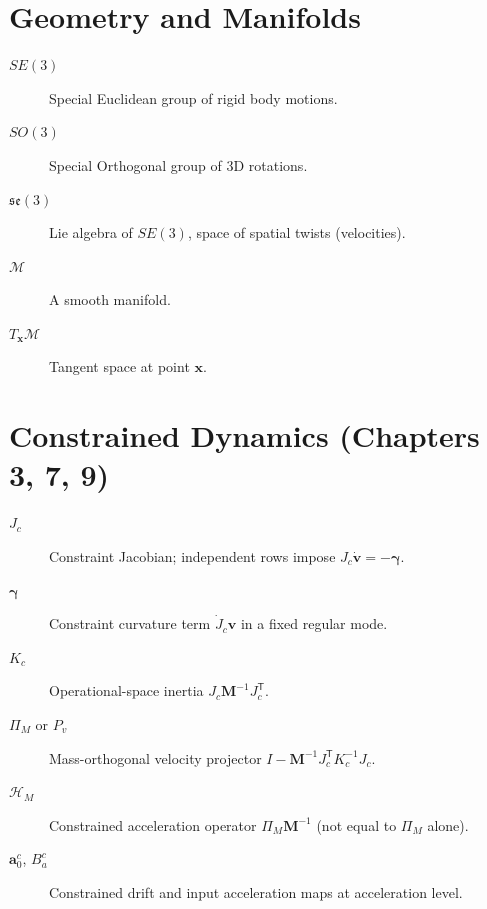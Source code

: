 \section*{Geometry and Manifolds}
\begin{description}
    \item[$SE(3)$] Special Euclidean group of rigid body motions.
    \item[$SO(3)$] Special Orthogonal group of 3D rotations.
    \item[$\mathfrak{se}(3)$] Lie algebra of $SE(3)$, space of spatial twists (velocities).
    \item[$\mathcal{M}$] A smooth manifold.
    \item[$T_{\mathbf{x}}\mathcal{M}$] Tangent space at point $\mathbf{x}$.
\end{description}

\section*{Constrained Dynamics (Chapters 3, 7, 9)}
\begin{description}
    \item[$J_c$] Constraint Jacobian; independent rows impose $J_c\dot{\mathbf{v}}=-\boldsymbol{\gamma}$.
    \item[$\boldsymbol{\gamma}$] Constraint curvature term $\dot{J}_c\mathbf{v}$ in a fixed regular mode.
    \item[$K_c$] Operational-space inertia $J_c\mathbf{M}^{-1}J_c^{\mathsf T}$.
    \item[$\Pi_M$ or $P_v$] Mass-orthogonal velocity projector $I-\mathbf{M}^{-1}J_c^{\mathsf T}K_c^{-1}J_c$.
    \item[$\mathcal{H}_M$] Constrained acceleration operator $\Pi_M\mathbf{M}^{-1}$ (not equal to $\Pi_M$ alone).
    \item[$\mathbf{a}_0^c$, $B_a^c$] Constrained drift and input acceleration maps at acceleration level.
\end{description}
